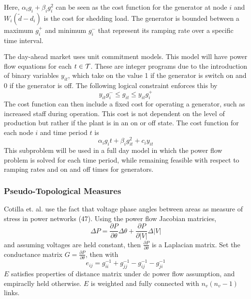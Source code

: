 Here, $\alpha_i g_i + \beta_i g_i^2$ can be seen as the cost function for the generator at node $i$ and $W_i(\tilde{d} - d_i)$ is the cost for shedding load.  The generator is bounded between a maximum $g_i^+$ and minimum $g_i^-$ that represent its ramping rate over a specific time interval.  

The day-ahead market uses unit commitment models.  This model will have power flow equations for each $t \in \mathcal{T}$.  These are integer programs due to the introduction of binary variables $y_{it}$, which take on the value 1 if the generator is switch on and 0 if the generator is off.  The following logical constraint enforces this by
\begin{equation}
y_{it} g_i^- \le g_{it} \le y_{it} g_i^+
\end{equation}
The cost function can then include a fixed cost for operating a generator, such as increased staff during operation.  This cost is not dependent on the level of production but rather if the plant is in an on or off state.  The cost function for each node $i$ and time period $t$ is
\begin{equation}
\alpha_i g_it + \beta_i g_{it}^2 + c_i y_{it}
\end{equation}
This subproblem will be used in a full day model in which the power flow problem is solved for each time period, while remaining feasible with respect to ramping rates and on and off times for generators.



\subsubsection{Pseudo-Topological Measures}
Cotilla et. al. \cite{cotilla_2012} use the fact that voltage phase angles between areas as measure of stress in power networks (47).  Using the power flow Jacobian matricies,
\begin{equation}
 \Delta P = \frac{ \partial P }{ \partial \theta} \Delta \theta + \frac{ \partial P }{ \partial | V | } \Delta | V |
\end{equation}
and assuming voltages are held constant, then $\frac{ \partial P }{ \partial \theta} $ is a Laplacian matrix.
Set the conductance matrix $G = \frac{ \partial P }{ \partial \theta}$, then with
\begin{equation}
e_{ij} = g_{ii}^{-1} + g_{jj}^{-1} - g_{ij}^{-1} - g_{ji}^{-1}
\end{equation}
$E$ satisfies properties of distance matrix under dc power flow assumption, and empiraclly held otherwise.  $E$ is weighted and fully connected with $n_v(n_v-1)$ links.

